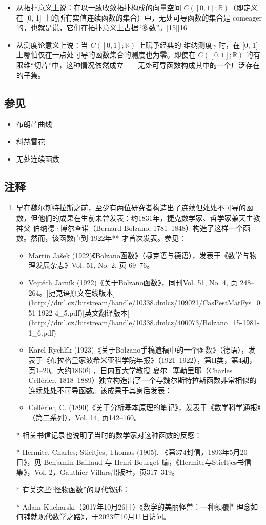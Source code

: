\begin{itemize}
\item 从拓扑意义上说：在以一致收敛拓扑构成的向量空间 $C([0, 1]; \mathbb{R})$（即定义在 [0, 1] 上的所有实值连续函数的集合）中，无处可导函数的集合是 comeager 的，也就是说，它们在拓扑意义上占据“多数”。[15][16]
\item 从测度论意义上说：当 $C([0, 1]; \mathbb{R})$ 上赋予经典的 维纳测度$\gamma$ 时，在 [0, 1] 上哪怕仅在一点处可导的函数集合的测度也为零。即使在 $C([0, 1]; \mathbb{R})$ 的有限维“切片”中，这种情况依然成立——无处可导函数构成其中的一个广泛存在的子集。
\end{itemize}
\subsection{参见}
\begin{itemize}
\item 布朗芒曲线
\item 科赫雪花
\item 无处连续函数
\end{itemize}
\subsection{注释}
\begin{enumerate}
\item 早在魏尔斯特拉斯之前，至少有两位研究者构造出了连续但处处不可导的函数，但他们的成果在生前未曾发表：约1831年，捷克数学家、哲学家兼天主教神父 伯纳德·博尔查诺（Bernard Bolzano, 1781–1848）构造了这样一个函数。然而，该函数直到 1922年** 才首次发表。参见：
  \begin{itemize}
  \item Martin Jašek (1922)《Bolzano函数》（捷克语与德语），发表于《数学与物理发展杂志》Vol. 51, No. 2, 页 69–76。
  \item Vojtěch Jarník (1922)《关于Bolzano函数》，同刊Vol. 51, No. 4, 页 248–264。[捷克语原文在线版本](http://dml.cz/bitstream/handle/10338.dmlcz/109021/CasPestMatFys_051-1922-4_5.pdf)[英文翻译版本](http://dml.cz/bitstream/handle/10338.dmlcz/400073/Bolzano_15-1981-1_6.pdf)
  \item Karel Rychlík (1923)《关于Bolzano手稿遗稿中的一个函数》（德语），发表于《布拉格皇家波希米亚科学院年报》（1921–1922），第II类，第4期，页1–20。大约1860年，日内瓦大学教授 夏尔·塞勒里耶（Charles Cellérier, 1818–1889）独立构造出了一个与魏尔斯特拉斯函数非常相似的连续处处不可导函数。该成果于其身后发表：
  \item Cellérier, C. (1890)《关于分析基本原理的笔记》，发表于《数学科学通报》（第二系列），Vol. 14, 页142–160。
  \end{itemize}

* 相关书信记录也说明了当时的数学家对这种函数的反感：

  * Hermite, Charles; Stieltjes, Thomas (1905). 《第374封信，1893年5月20日》，见 Benjamin Baillaud 与 Henri Bourget 编，《Hermite与Stieltjes书信集》，Vol. 2，Gauthier-Villars出版社，页317–319。

* 有关这些“怪物函数”的现代叙述：

  * Adam Kucharski（2017年10月26日）《数学的美丽怪兽：一种颠覆性理念如何铺就现代数学之路》，于2023年10月11日访问。

\end{enumerate}